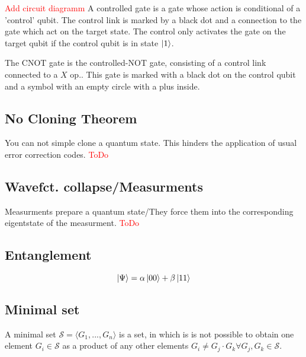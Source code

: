 \textcolor{red}{Add circuit diagramm}
A controlled gate is a gate whose action is conditional of a 'control' qubit.
The control link is marked by a black dot and a connection to the gate which act on the target state. 
The control only activates the gate on the target qubit if the control qubit is in state $\ket{1}$.

The CNOT gate is the controlled-NOT gate, consisting of a control link connected to a $X$ op.. 
This gate is marked with a black dot on the control qubit and a symbol with an empty circle with a plus inside.


\subsection{No Cloning Theorem}\label{sec:basic.math.no_cloning_theorem}
You can not simple clone a quantum state. 
This hinders the application of usual error correction codes.
\textcolor{red}{ToDo}

\subsection{Wavefct. collapse/Measurments}\label{sec:basic.math.wavefct_collpase}
Measurments prepare a quantum state/They force them into the corresponding eigentstate of the measurment.
\textcolor{red}{ToDo}

\subsection{Entanglement}
\begin{equation}
    \ket{\Psi} = \alpha \ket{00} + \beta \ket{11}
\end{equation}


\subsection{Minimal set}\label{sec:basic.math.minimal_set}

A minimal set $\mathcal{S}= \langle G_1,...,G_n\rangle$ is a set, 
in which is is not possible to obtain one element $G_i \in \mathcal{S}$ as a product of any other elements  $G_i \ne G_j \cdot G_k \forall G_j,G_k\in\mathcal{S}$.
